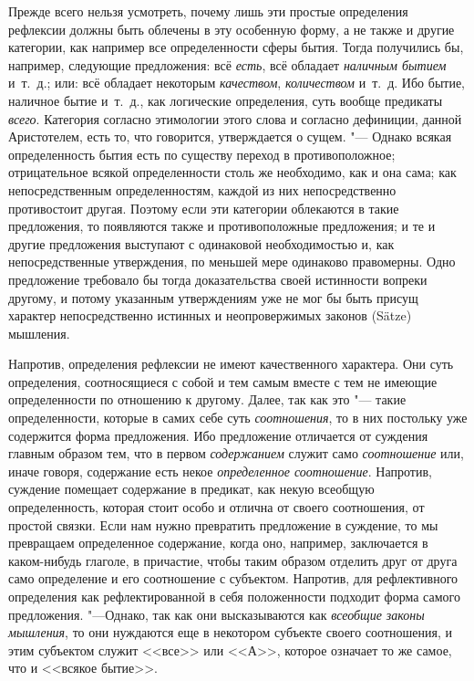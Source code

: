 Прежде всего нельзя усмотреть, почему лишь эти простые определения рефлексии
должны быть облечены в эту особенную форму, а не также и другие категории,
как например все определенности сферы бытия. Тогда получились бы, например,
следующие предложения: всё {\em есть}, всё обладает
{\em наличным бытием} и~т.~д.; или: всё обладает некоторым {\em качеством},
{\em количеством} и~т.~д. Ибо бытие, наличное бытие
и~т.~д., как логические определения, суть вообще предикаты
{\em всего}. Категория согласно этимологии этого слова
и согласно дефиниции, данной Аристотелем, есть то, что говорится,
утверждается о сущем. "--- Однако всякая определенность бытия есть по существу
переход в противоположное; отрицательное всякой определенности столь же
необходимо, как и она сама; как непосредственным определенностям, каждой из
них непосредственно противостоит другая. Поэтому если эти категории
облекаются в такие предложения, то появляются также и противоположные
предложения; и те и другие предложения выступают с одинаковой
необходимостью и, как непосредственные утверждения, по меньшей мере
одинаково правомерны. Одно предложение требовало бы тогда доказательства
своей истинности вопреки другому, и потому указанным утверждениям уже не
мог бы быть присущ характер непосредственно истинных и неопровержимых
законов (Sätze) мышления.

Напротив, определения рефлексии не имеют качественного характера. Они суть
определения, соотносящиеся с собой и тем самым вместе с тем не имеющие
определенности по отношению к другому. Далее, так как это "--- такие
определенности, которые в самих себе суть
{\em соотношения}, то в них постольку уже содержится
форма предложения. Ибо предложение отличается от суждения главным образом
тем, что в первом {\em содержанием} служит само
{\em соотношение} или, иначе говоря, содержание есть
некое {\em определенное соотношение}. Напротив,
суждение помещает содержание в предикат, как некую всеобщую определенность,
которая стоит особо и отлична от своего соотношения, от простой связки.
Если нам нужно превратить предложение в суждение, то мы превращаем
определенное содержание, когда оно, например, заключается в каком-нибудь
глаголе, в причастие, чтобы таким образом отделить друг от друга само
определение и его соотношение с субъектом. Напротив, для рефлективного
определения как рефлектированной в себя положенности подходит форма самого
предложения. "---Однако, так как они высказываются как
{\em всеобщие законы мышления}, то они нуждаются еще в
некотором субъекте своего соотношения, и этим субъектом служит <<все>> или
<<$А$>>, которое означает то же самое, что и <<всякое бытие>>.

